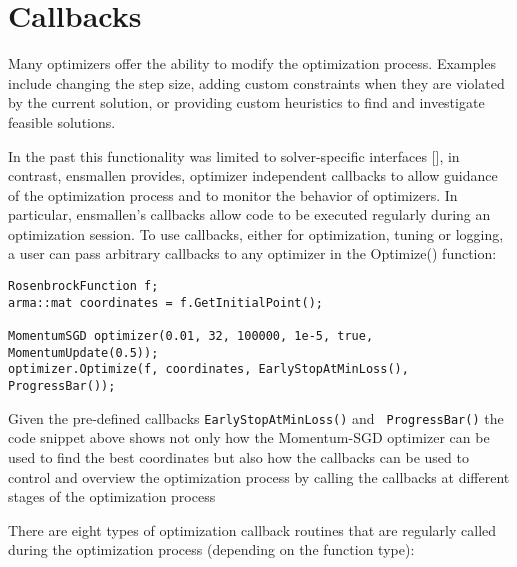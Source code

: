 \section{Callbacks}
\label{sec:callbacks}

Many optimizers offer the ability to modify the optimization process. Examples
include changing the step size, adding custom constraints when they are violated
by the current solution, or providing custom heuristics to find and investigate
feasible solutions.

In the past this functionality was limited to solver-specific interfaces [], in
contrast, ensmallen provides, optimizer independent callbacks to allow guidance
of the optimization process and to monitor the behavior of optimizers. In
particular, ensmallen's callbacks allow code to be executed regularly during an
optimization session. To use callbacks, either for optimization, tuning or
logging, a user can pass arbitrary callbacks to any optimizer in the Optimize()
function:

\begin{verbatim}
RosenbrockFunction f;
arma::mat coordinates = f.GetInitialPoint();

MomentumSGD optimizer(0.01, 32, 100000, 1e-5, true, MomentumUpdate(0.5));
optimizer.Optimize(f, coordinates, EarlyStopAtMinLoss(), ProgressBar());
\end{verbatim}

Given the pre-defined callbacks {\tt EarlyStopAtMinLoss()} and {\tt
ProgressBar()} the code snippet above shows not only how the Momentum-SGD
optimizer can be used to find the best coordinates but also how the callbacks
can be used to control and overview the optimization process by calling the
callbacks at different stages of the optimization process

There are eight types of optimization callback routines that are regularly
called during the optimization process (depending on the function type):

